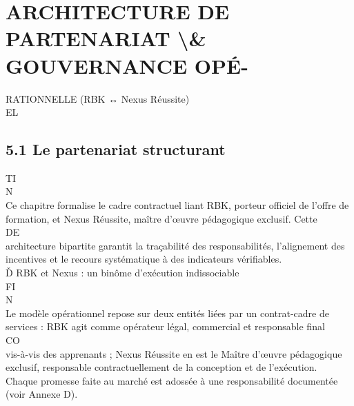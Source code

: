 \section{ARCHITECTURE DE PARTENARIAT \textbackslash{}& GOUVERNANCE OPÉ-}
RATIONNELLE (RBK ↔ Nexus Réussite)\\
\vspace{0.5em}
\vspace{0.5em}
\vspace{0.5em}
\vspace{0.5em}
EL\\
\subsection{5.1 Le partenariat structurant}
\vspace{0.5em}
\vspace{0.5em}
\vspace{0.5em}
\vspace{0.5em}
TI\\
N\\
Ce chapitre formalise le cadre contractuel liant RBK, porteur officiel de l’offre de formation, et Nexus Réussite, maître d’œuvre pédagogique exclusif. Cette\\
\vspace{0.5em}
\vspace{0.5em}
\vspace{0.5em}
\vspace{0.5em}
DE\\
architecture bipartite garantit la traçabilité des responsabilités, l’alignement des incentives et le recours systématique à des indicateurs vérifiables.\\
\vspace{0.5em}
Ď RBK et Nexus : un binôme d’exécution indissociable\\
\vspace{0.5em}
FI\\
N\\
Le modèle opérationnel repose sur deux entités liées par un contrat-cadre de services : RBK agit comme opérateur légal, commercial et responsable final\\
CO\\
vis-à-vis des apprenants ; Nexus Réussite en est le Maître d’œuvre pédagogique exclusif, responsable contractuellement de la conception et de l’exécution.\\
Chaque promesse faite au marché est adossée à une responsabilité documentée (voir Annexe D).\\
\vspace{0.5em}
\vspace{0.5em}
\vspace{0.5em}
